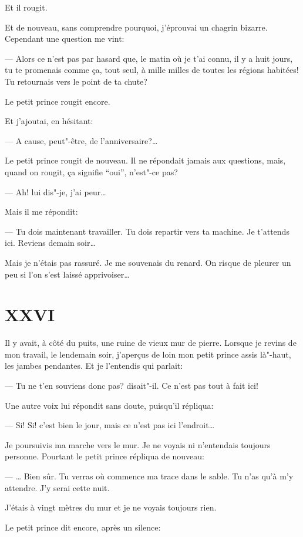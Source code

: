 \begin{Parallel}[p]{}{}
{Et il rougit.

Et de nouveau, sans comprendre pourquoi, j'éprouvai un chagrin bizarre. Cependant
une question me vint:

--- Alors ce n'est pas par hasard que, le matin où je t'ai connu, il y a huit jours,
tu te promenais comme ça, tout seul, à mille milles de toutes les régions habitées!
Tu retournais vers le point de ta chute?

Le petit prince rougit encore.

Et j'ajoutai, en hésitant:

--- A cause, peut"-être, de l'anniversaire?\ldots{}

Le petit prince rougit de nouveau. Il ne répondait jamais aux questions, mais, quand
on rougit, ça signifie ``oui'', n'est"-ce pas?

--- Ah! lui dis"-je, j'ai peur\ldots{}

Mais il me répondit:

--- Tu dois maintenant travailler. Tu dois repartir vers ta machine. Je t'attends ici.
Reviens demain soir\ldots{}

Mais je n'étais pas rassuré. Je me souvenais du renard. On risque de pleurer un peu
si l'on s'est laissé apprivoiser\ldots{}

\section{XXVI}

Il y avait, à côté du puits, une ruine de vieux mur de pierre. Lorsque je
revins de mon travail, le lendemain soir, j'aperçus de loin mon petit prince
assis là"-haut, les jambes pendantes. Et je l'entendis qui parlait:

--- Tu ne t'en souviens donc pas? disait"-il. Ce n'est pas tout à fait ici!

Une autre voix lui répondit sans doute, puisqu'il répliqua:

--- Si! Si! c'est bien le jour, mais ce n'est pas ici l'endroit\ldots{}

Je poursuivis ma marche vers le mur. Je ne voyais ni n'entendais toujours
personne. Pourtant le petit prince répliqua de nouveau:

--- \ldots{} Bien sûr. Tu verras où commence ma trace dans le sable. Tu n'as
qu’à m'y attendre. J'y serai cette nuit.

J'étais à vingt mètres du mur et je ne voyais toujours rien.

Le petit prince dit encore, après un silence:

}
\end{Parallel}
